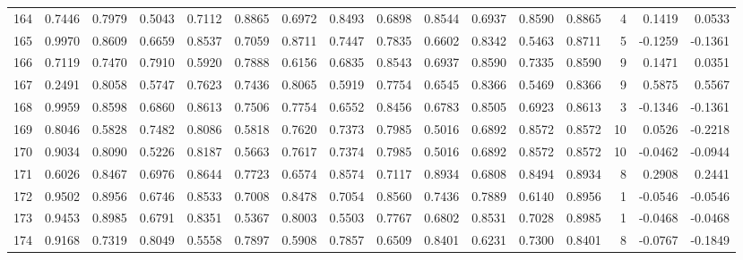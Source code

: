 \begin{tabular}{lrrrrrrrrrrrrrrr}
164 &      0.7446 &  0.7979 &  0.5043 &  0.7112 &  0.8865 &  0.6972 &  0.8493 &  0.6898 &  0.8544 &  0.6937 &   0.8590 &     0.8865 &      4 &                    0.1419 &                     0.0533 \\
165 &      0.9970 &  0.8609 &  0.6659 &  0.8537 &  0.7059 &  0.8711 &  0.7447 &  0.7835 &  0.6602 &  0.8342 &   0.5463 &     0.8711 &      5 &                   -0.1259 &                    -0.1361 \\
166 &      0.7119 &  0.7470 &  0.7910 &  0.5920 &  0.7888 &  0.6156 &  0.6835 &  0.8543 &  0.6937 &  0.8590 &   0.7335 &     0.8590 &      9 &                    0.1471 &                     0.0351 \\
167 &      0.2491 &  0.8058 &  0.5747 &  0.7623 &  0.7436 &  0.8065 &  0.5919 &  0.7754 &  0.6545 &  0.8366 &   0.5469 &     0.8366 &      9 &                    0.5875 &                     0.5567 \\
168 &      0.9959 &  0.8598 &  0.6860 &  0.8613 &  0.7506 &  0.7754 &  0.6552 &  0.8456 &  0.6783 &  0.8505 &   0.6923 &     0.8613 &      3 &                   -0.1346 &                    -0.1361 \\
169 &      0.8046 &  0.5828 &  0.7482 &  0.8086 &  0.5818 &  0.7620 &  0.7373 &  0.7985 &  0.5016 &  0.6892 &   0.8572 &     0.8572 &     10 &                    0.0526 &                    -0.2218 \\
170 &      0.9034 &  0.8090 &  0.5226 &  0.8187 &  0.5663 &  0.7617 &  0.7374 &  0.7985 &  0.5016 &  0.6892 &   0.8572 &     0.8572 &     10 &                   -0.0462 &                    -0.0944 \\
171 &      0.6026 &  0.8467 &  0.6976 &  0.8644 &  0.7723 &  0.6574 &  0.8574 &  0.7117 &  0.8934 &  0.6808 &   0.8494 &     0.8934 &      8 &                    0.2908 &                     0.2441 \\
172 &      0.9502 &  0.8956 &  0.6746 &  0.8533 &  0.7008 &  0.8478 &  0.7054 &  0.8560 &  0.7436 &  0.7889 &   0.6140 &     0.8956 &      1 &                   -0.0546 &                    -0.0546 \\
173 &      0.9453 &  0.8985 &  0.6791 &  0.8351 &  0.5367 &  0.8003 &  0.5503 &  0.7767 &  0.6802 &  0.8531 &   0.7028 &     0.8985 &      1 &                   -0.0468 &                    -0.0468 \\
174 &      0.9168 &  0.7319 &  0.8049 &  0.5558 &  0.7897 &  0.5908 &  0.7857 &  0.6509 &  0.8401 &  0.6231 &   0.7300 &     0.8401 &      8 &                   -0.0767 &                    -0.1849 \\

\end{tabular}
